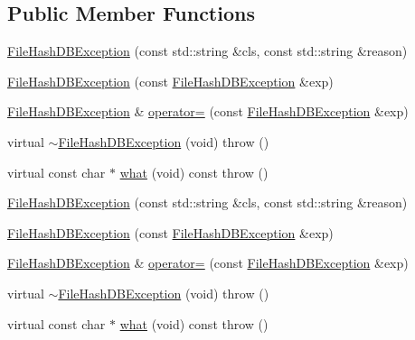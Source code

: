 \subsection*{Public Member Functions}
\begin{DoxyCompactItemize}
\item 
\mbox{\hyperlink{classFILEDB_1_1FileHashDBException_ae549056e12f10f0bb24e0875a70ec57b}{File\+Hash\+D\+B\+Exception}} (const std\+::string \&cls, const std\+::string \&reason)
\item 
\mbox{\hyperlink{classFILEDB_1_1FileHashDBException_ad018a7bda0cfd93d2efac5c16c10886e}{File\+Hash\+D\+B\+Exception}} (const \mbox{\hyperlink{classFILEDB_1_1FileHashDBException}{File\+Hash\+D\+B\+Exception}} \&exp)
\item 
\mbox{\hyperlink{classFILEDB_1_1FileHashDBException}{File\+Hash\+D\+B\+Exception}} \& \mbox{\hyperlink{classFILEDB_1_1FileHashDBException_a82f111a87cc81fef84c32f76ebbd15d7}{operator=}} (const \mbox{\hyperlink{classFILEDB_1_1FileHashDBException}{File\+Hash\+D\+B\+Exception}} \&exp)
\item 
virtual \mbox{\hyperlink{classFILEDB_1_1FileHashDBException_af163ad5163826f561cd5f997efff6287}{$\sim$\+File\+Hash\+D\+B\+Exception}} (void)  throw ()
\item 
virtual const char $\ast$ \mbox{\hyperlink{classFILEDB_1_1FileHashDBException_aaacefcbfdcc4a6c86affdaf5cca924e9}{what}} (void) const  throw ()
\item 
\mbox{\hyperlink{classFILEDB_1_1FileHashDBException_ae549056e12f10f0bb24e0875a70ec57b}{File\+Hash\+D\+B\+Exception}} (const std\+::string \&cls, const std\+::string \&reason)
\item 
\mbox{\hyperlink{classFILEDB_1_1FileHashDBException_ad018a7bda0cfd93d2efac5c16c10886e}{File\+Hash\+D\+B\+Exception}} (const \mbox{\hyperlink{classFILEDB_1_1FileHashDBException}{File\+Hash\+D\+B\+Exception}} \&exp)
\item 
\mbox{\hyperlink{classFILEDB_1_1FileHashDBException}{File\+Hash\+D\+B\+Exception}} \& \mbox{\hyperlink{classFILEDB_1_1FileHashDBException_ac7678441c40ae0bf44d1156dbabd596a}{operator=}} (const \mbox{\hyperlink{classFILEDB_1_1FileHashDBException}{File\+Hash\+D\+B\+Exception}} \&exp)
\item 
virtual \mbox{\hyperlink{classFILEDB_1_1FileHashDBException_aacf132dca5ed0d1b8dc3e4694c77c190}{$\sim$\+File\+Hash\+D\+B\+Exception}} (void)  throw ()
\item 
virtual const char $\ast$ \mbox{\hyperlink{classFILEDB_1_1FileHashDBException_aa8588fe36ad351eb1c1f17db8b48d349}{what}} (void) const  throw ()
\end{DoxyCompactItemize}
